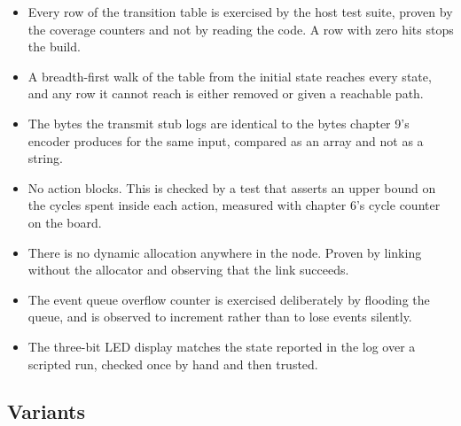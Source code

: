 \begin{itemize}
\item Every row of the transition table is exercised by the host test suite,
proven by the coverage counters and not by reading the code. A row with zero
hits stops the build.
\item A breadth-first walk of the table from the initial state reaches every
state, and any row it cannot reach is either removed or given a reachable path.
\item The bytes the transmit stub logs are identical to the bytes chapter 9's
encoder produces for the same input, compared as an array and not as a string.
\item No action blocks. This is checked by a test that asserts an upper bound
on the cycles spent inside each action, measured with chapter 6's cycle counter
on the board.
\item There is no dynamic allocation anywhere in the node. Proven by linking
without the allocator and observing that the link succeeds.
\item The event queue overflow counter is exercised deliberately by flooding
the queue, and is observed to increment rather than to lose events silently.
\item The three-bit LED display matches the state reported in the log over a
scripted run, checked once by hand and then trusted.
\end{itemize}

\subsection*{Variants}

